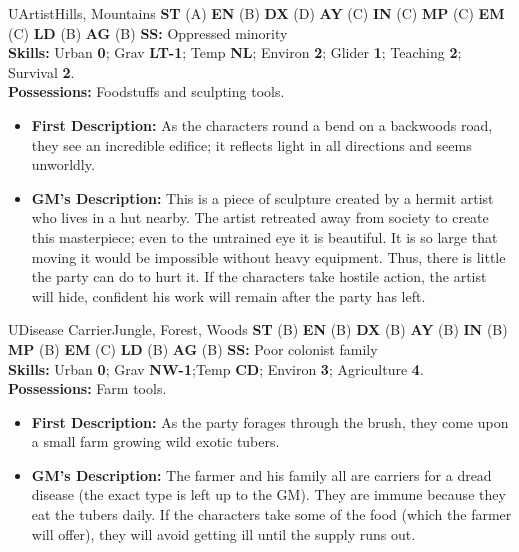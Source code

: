 \hrulefill

\begin{npc}{U}{Artist}{Hills, Mountains}
\textbf{ST} (A) \textbf{EN} (B) \textbf{DX} (D) \textbf{AY} (C) \textbf{IN} (C) \textbf{MP} (C) \textbf{EM} (C) \textbf{LD} (B) \textbf{AG} (B) \textbf{SS:} Oppressed minority \\
\textbf{Skills:} Urban \textbf{0}; Grav \textbf{LT-1}; Temp \textbf{NL}; Environ \textbf{2}; Glider \textbf{1}; Teaching \textbf{2}; Survival \textbf{2}. \\
\textbf{Possessions:} Foodstuffs and sculpting tools. 
\begin{itemize}
\item \textbf{First Description:} As the characters round a bend on a backwoods road, they see an incredible edifice; it reflects light in all directions and seems unworldly. 
\item \textbf{GM's Description:} This is a piece of sculpture created by a hermit artist who lives in a hut nearby. The artist retreated away from 
society to create this masterpiece; even to the untrained eye it is beautiful. It is so large that moving it would be impossible without 
heavy equipment. Thus, there is little the party can do to hurt it. If the characters take hostile action, the artist will hide, confident his 
work will remain after the party has left. 
\end{itemize}
\end{npc}

\hrulefill

\begin{npc}{U}{Disease Carrier}{Jungle, Forest, Woods}
\textbf{ST} (B) \textbf{EN} (B) \textbf{DX} (B) \textbf{AY} (B) \textbf{IN} (B) \textbf{MP} (B) \textbf{EM} (C) \textbf{LD} (B) \textbf{AG} (B) \textbf{SS:} Poor colonist family \\
\textbf{Skills:} Urban \textbf{0}; Grav \textbf{NW-1};Temp \textbf{CD}; Environ \textbf{3}; Agriculture \textbf{4}. \\
\textbf{Possessions:} Farm tools. 
\begin{itemize}
\item \textbf{First Description:} As the party forages through the brush, they come upon a small farm growing wild exotic tubers. 
\item \textbf{GM's Description:} The farmer and his family all are carriers for a dread disease (the exact type is left up to the GM). They are immune because they eat the tubers daily. If the characters take some of the food (which the farmer will offer), they will avoid getting ill 
until the supply runs out. 
\end{itemize}
\end{npc}

